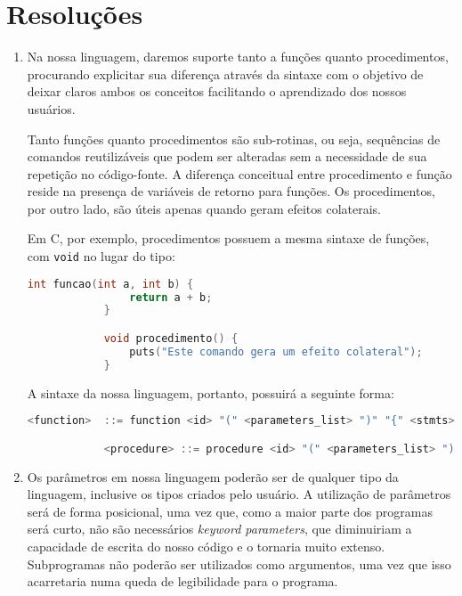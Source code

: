 \documentclass[12pt, a4paper]{article}
\begin{document}
\section{Resoluções}
    \begin{enumerate}
        \item
        Na nossa linguagem, daremos suporte tanto a funções quanto
        procedimentos, procurando explicitar sua diferença através da sintaxe
        com o objetivo de deixar claros ambos os conceitos facilitando o
        aprendizado dos nossos usuários.

        Tanto funções quanto procedimentos são sub-rotinas, ou seja, sequências
        de comandos reutilizáveis que podem ser alteradas sem a necessidade de
        sua repetição no código-fonte. A diferença conceitual entre
        procedimento e função reside na presença de variáveis de retorno para
        funções. Os procedimentos, por outro lado, são úteis apenas quando
        geram efeitos colaterais.

        Em C, por exemplo, procedimentos possuem a mesma sintaxe de funções,
        com \texttt{void} no lugar do tipo:

        \begin{lstlisting}[language=C]
            int funcao(int a, int b) {
                return a + b;
            }

            void procedimento() {
                puts("Este comando gera um efeito colateral");
            }
        \end{lstlisting}

        A sintaxe da nossa linguagem, portanto, possuirá a seguinte forma:

        \begin{lstlisting}[language=C]
            <function>  ::= function <id> "(" <parameters_list> ")" "{" <stmts> <return_stmt> "}"

            <procedure> ::= procedure <id> "(" <parameters_list> ")" "{" <stmts> "}"
        \end{lstlisting}

        \item
        Os parâmetros em nossa linguagem poderão ser de qualquer tipo da
        linguagem, inclusive os tipos criados pelo usuário. A utilização de
        parâmetros será de forma posicional, uma vez que, como a maior parte
        dos programas será curto, não são necessários \emph{keyword
        parameters}, que diminuiriam a capacidade de escrita do nosso código e
        o tornaria muito extenso. Subprogramas não poderão ser utilizados como
        argumentos, uma vez que isso acarretaria numa queda de legibilidade
        para o programa.


\end{enumerate}
\end{document}
